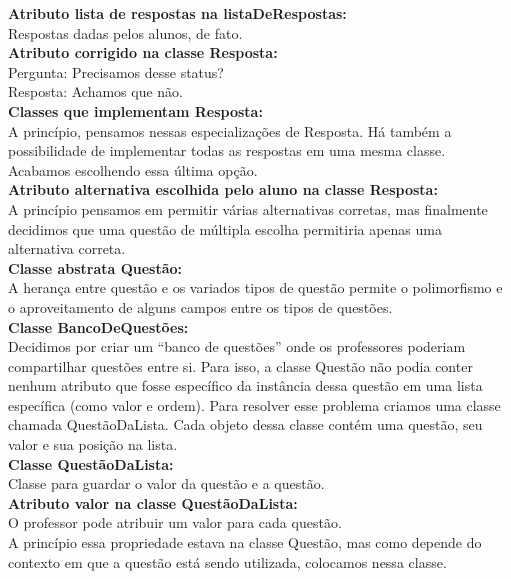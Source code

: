 \documentclass[12pt,letterpaper]{article}
\begin{document}
\textbf{Atributo lista de respostas na listaDeRespostas:}\\
Respostas dadas pelos alunos, de fato.\\

\textbf{Atributo corrigido na classe Resposta: }\\
Pergunta: Precisamos desse status?\\
Resposta: Achamos que não.\\

\textbf{Classes que implementam Resposta:}\\
A princípio, pensamos nessas especializações de Resposta. Há também a possibilidade de implementar todas as respostas em uma mesma classe. Acabamos escolhendo essa última opção.\\

\textbf{Atributo alternativa escolhida pelo aluno na classe Resposta:}\\
A princípio pensamos em permitir várias alternativas corretas, mas finalmente decidimos que uma questão de múltipla escolha permitiria apenas uma alternativa correta.\\

\textbf{Classe abstrata Questão:}\\
A herança entre questão e os variados tipos de questão permite o polimorfismo e o aproveitamento de alguns campos entre os tipos de questões.\\

\textbf{Classe BancoDeQuestões:}\\
Decidimos por criar um “banco de questões” onde os professores poderiam compartilhar questões entre si. Para isso, a classe Questão não podia conter nenhum atributo que fosse específico da instância dessa questão em uma lista específica (como valor e ordem). Para resolver esse problema criamos uma classe chamada QuestãoDaLista. Cada objeto dessa classe contém uma questão, seu valor e sua posição na lista.\\

\textbf{Classe QuestãoDaLista:}\\
Classe para guardar o valor da questão e a questão.\\

\textbf{Atributo valor na classe QuestãoDaLista:}\\
O professor pode atribuir um valor para cada questão.\\
A princípio essa propriedade estava na classe Questão, mas como depende do contexto em que a questão está sendo utilizada, colocamos nessa classe.\\
\end{document}
